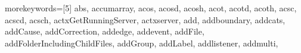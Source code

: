 {    %
    morekeywords=[5]{%
        abs,%
        accumarray,%
        acos,%
        acosd,%
        acosh,%
        acot,%
        acotd,%
        acoth,%
        acsc,%
        acscd,%
        acsch,%
        actxGetRunningServer,%
        actxserver,%
        add,%
        addboundary,%
        addcats,%
        addCause,%
        addCorrection,%
        addedge,%
        addevent,%
        addFile,%
        addFolderIncludingChildFiles,%
        addGroup,%
        addLabel,%
        addlistener,%
        addmulti,%
}}
